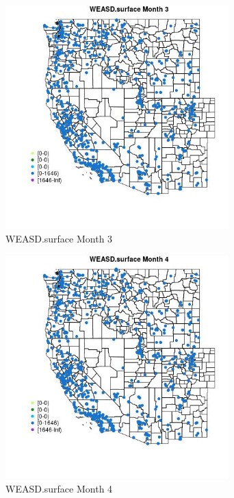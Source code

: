 \begin{figure} 
\centering  
\includegraphics[width=0.77\textwidth]{Code_Outputs/Report_ML_input_PM25_Step4_part_f_de_duplicated_aveswNAs_MapObsMo3WEASDsurface.jpg} 
\caption{\label{fig:Report_ML_input_PM25_Step4_part_f_de_duplicated_aveswNAsMapObsMo3WEASDsurface}WEASD.surface Month 3} 
\end{figure} 
 

\begin{figure} 
\centering  
\includegraphics[width=0.77\textwidth]{Code_Outputs/Report_ML_input_PM25_Step4_part_f_de_duplicated_aveswNAs_MapObsMo4WEASDsurface.jpg} 
\caption{\label{fig:Report_ML_input_PM25_Step4_part_f_de_duplicated_aveswNAsMapObsMo4WEASDsurface}WEASD.surface Month 4} 
\end{figure} 
 

